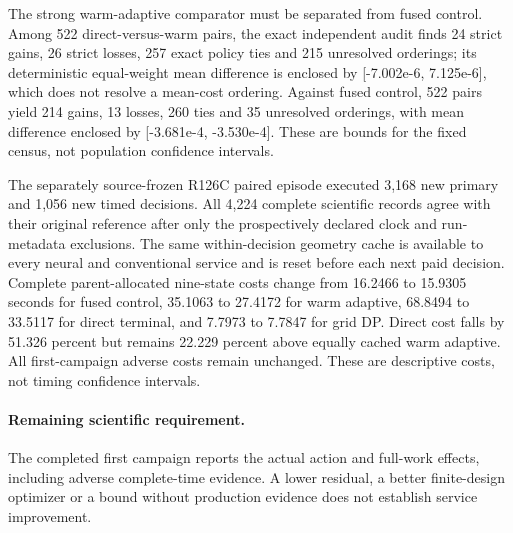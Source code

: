 The strong warm-adaptive comparator must be separated from fused control. Among 522 direct-versus-warm pairs, the exact independent audit finds 24 strict gains, 26 strict losses, 257 exact policy ties and 215 unresolved orderings; its deterministic equal-weight mean difference is enclosed by [-7.002e-6, 7.125e-6], which does not resolve a mean-cost ordering. Against fused control, 522 pairs yield 214 gains, 13 losses, 260 ties and 35 unresolved orderings, with mean difference enclosed by [-3.681e-4, -3.530e-4]. These are bounds for the fixed census, not population confidence intervals.\par
The separately source-frozen R126C paired episode executed 3,168 new primary and 1,056 new timed decisions. All 4,224 complete scientific records agree with their original reference after only the prospectively declared clock and run-metadata exclusions. The same within-decision geometry cache is available to every neural and conventional service and is reset before each next paid decision. Complete parent-allocated nine-state costs change from 16.2466 to 15.9305 seconds for fused control, 35.1063 to 27.4172 for warm adaptive, 68.8494 to 33.5117 for direct terminal, and 7.7973 to 7.7847 for grid DP. Direct cost falls by 51.326 percent but remains 22.229 percent above equally cached warm adaptive. All first-campaign adverse costs remain unchanged. These are descriptive costs, not timing confidence intervals.\par

\paragraph{Remaining scientific requirement.} The completed first campaign reports the actual action and full-work effects, including adverse complete-time evidence. A lower residual, a better finite-design optimizer or a bound without production evidence does not establish service improvement.


